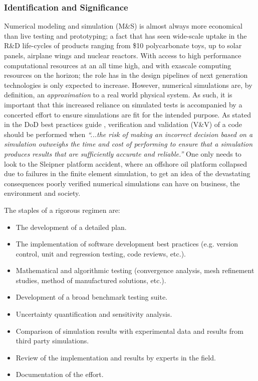 \subsubsection{Identification and Significance}
\label{intro}
Numerical modeling and simulation (M\&S) is almost always more economical than live testing and prototyping; a fact that has seen wide-scale uptake in the R\&D life-cycles of products ranging from \$10 polycarbonate toys, up to solar panels, airplane wings and nuclear reactors. With access to high performance computational resources at an all time high, and with exascale computing resources on the horizon; the role \MS has in the design pipelines of next generation technologies is only expected to increase. However, numerical simulations are, by definition, an \emph{approximation} to a real world physical system. As such, it is important that this increased reliance on simulated tests is accompanied by a concerted effort to ensure simulations are fit for the intended purpose. As stated in the DoD best practices guide \cite{dodvv}, verification and validation (V\&V) of a code should be performed when  \emph{``...the risk of making an incorrect decision based on a simulation outweighs the time and cost of performing \VV to ensure that a simulation produces results that are sufficiently accurate and reliable.''} One only needs to look to the Sleipner platform accident, where an offshore oil platform collapsed due to failures in the finite element simulation, to get an idea of the devastating consequences poorly verified numerical simulations can have on business, the environment and society.

The staples of a rigorous \VV regimen are:

\begin{itemize}
 \item The development of a detailed \VV plan.
 \item The implementation of software development best practices (e.g. version control, unit and regression testing, code reviews, etc.).
 \item Mathematical and algorithmic testing (convergence analysis, mesh refinement studies, method of manufactured solutions, etc.).
 \item Development of a broad benchmark testing suite.
 \item Uncertainty quantification and sensitivity analysis.
 \item Comparison of simulation results with experimental data and results from third party simulations. 
 \item Review of the implementation and results by experts in the field.
 \item Documentation of the \VV effort.
\end{itemize}

